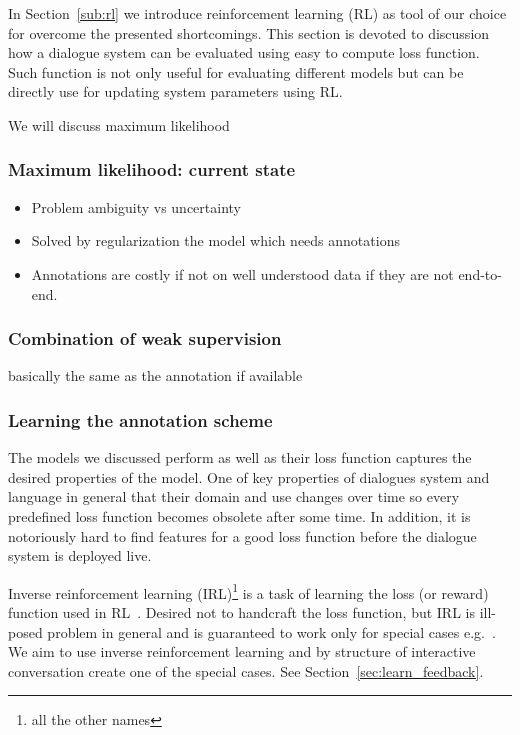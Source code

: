 \documentclass[11pt]{article}
\begin{document}
In Section~\ref{sub:rl} we introduce reinforcement learning (RL) as tool of our choice for overcome the presented shortcomings.
This section is devoted to discussion how a dialogue system can be evaluated using easy to compute loss function.
Such function is not only useful for evaluating different models but can be directly use for updating system parameters using RL.

We will discuss maximum likelihood

\subsubsection*{Maximum likelihood: current state}\label{sub:maximum_likelihood}
\begin{itemize}
    \item Problem ambiguity vs uncertainty
    \item Solved by regularization the model which needs annotations
    \item Annotations are costly if not on well understood data if they are not end-to-end.
\end{itemize}

\subsubsection*{Combination of weak supervision}\label{sub:batch_rl}
basically the same as the annotation if available


\subsubsection*{Learning the annotation scheme}\label{sub:irl}
The models we discussed perform as well as their loss function captures the desired properties of the model.
One of key properties of dialogues system and language in general that their domain and use changes over time so every predefined loss function becomes obsolete after some time.
In addition, it is notoriously hard to find features for a good loss function before the dialogue system is deployed live.

Inverse reinforcement learning (IRL)\footnote{all the other names} is a task of learning the loss (or reward) function used in RL~\cite{Ng1,2}.
Desired not to handcraft the loss function, but IRL is ill-posed problem in general and is guaranteed to work only for special cases e.g.~\cite{linear_Ng}.
We aim to use inverse reinforcement learning and by structure of interactive conversation create one of the special cases.
See Section~\ref{sec:learn_feedback}.
\end{document}
